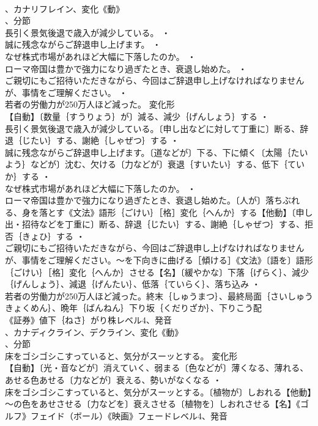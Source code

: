 \documentclass[8pt]{extreport}
\begin{document}
\begin{CJK}{UTF8}{min}
\\	、カナリフレイン、変化《動》
\\	、分節
\\	長引く景気後退で歳入が減少している。 ・
\\	誠に残念ながらご辞退申し上げます。 ・
\\	なぜ株式市場があれほど大幅に下落したのか。 ・
\\	ローマ帝国は豊かで強力になり過ぎたとき、衰退し始めた。 ・
\\	ご親切にもご招待いただきながら、今回はご辞退申し上げなければなりませんが、事情をご理解ください。 ・
\\	若者の労働力が250万人ほど減った。	変化形 
\\	【自動】〔数量｛すうりょう｝が〕減る、減少｛げんしょう｝する ・
\\	長引く景気後退で歳入が減少している。〔申し出などに対して丁重に〕断る、辞退｛じたい｝する、謝絶｛しゃぜつ｝する ・
\\	誠に残念ながらご辞退申し上げます。〔道などが〕下る、下に傾く〔太陽｛たいよう｝などが〕沈む、欠ける〔力などが〕衰退｛すいたい｝する、低下｛ていか｝する ・
\\	なぜ株式市場があれほど大幅に下落したのか。 ・
\\	ローマ帝国は豊かで強力になり過ぎたとき、衰退し始めた。〔人が〕落ちぶれる、身を落とす《文法》語形｛ごけい｝［格］変化｛へんか｝する【他動】〔申し出・招待などを丁重に〕断る、辞退｛じたい｝する、謝絶｛しゃぜつ｝する、拒否｛きょひ｝する ・
\\	ご親切にもご招待いただきながら、今回はご辞退申し上げなければなりませんが、事情をご理解ください。～を下向きに曲げる［傾ける］《文法》〔語を〕語形｛ごけい｝［格］変化｛へんか｝させる【名】〔緩やかな〕下落｛げらく｝、減少｛げんしょう｝、減退｛げんたい｝、低落｛ていらく｝、落ち込み ・
\\	若者の労働力が250万人ほど減った。終末｛しゅうまつ｝、最終局面｛さいしゅう きょくめん｝、晩年｛ばんねん｝下り坂｛くだりざか｝、下りこう配
\\	《証券》値下｛ねさ｝がり株レベル4、発音
\\	、カナディクライン、デクライン、変化《動》
\\	、分節
\\	床をゴシゴシこすっていると、気分がスーッとする。	変化形 
\\	【自動】〔光・音などが〕消えていく、弱まる〔色などが〕薄くなる、薄れる、あせる色あせる〔力などが〕衰える、勢いがなくなる ・
\\	床をゴシゴシこすっていると、気分がスーッとする。〔植物が〕しおれる【他動】～の色をあせさせる〔力などを〕衰えさせる〔植物を〕しおれさせる【名】《ゴルフ》フェイド（ボール）《映画》フェードレベル4、発音

\end{CJK}
\end{document}
